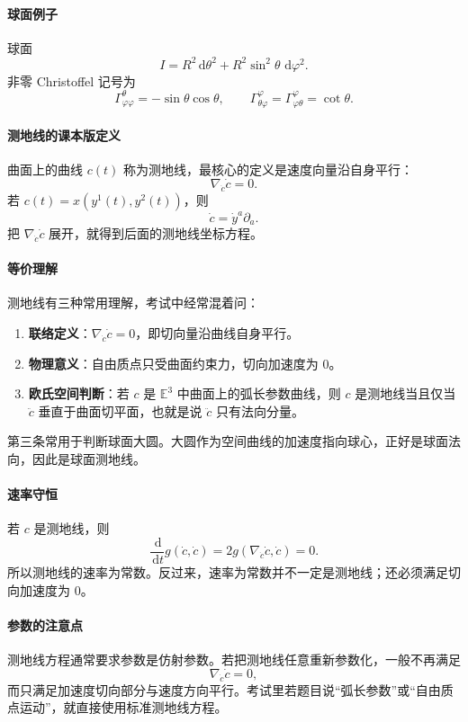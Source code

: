 \documentclass[UTF8,12pt,a4paper]{ctexart}
\newcommand{\E}{\mathbb E}
\newcommand{\dd}{\,\mathrm d}
\begin{document}
\paragraph{球面例子}
球面
\[
I=R^2\dd\theta^2+R^2\sin^2\theta\,\dd\varphi^2.
\]
非零 Christoffel 记号为
\[
\Gamma^\theta_{\varphi\varphi}=-\sin\theta\cos\theta,
\qquad
\Gamma^\varphi_{\theta\varphi}
=\Gamma^\varphi_{\varphi\theta}
=\cot\theta.
\]

\paragraph{测地线的课本版定义}
曲面上的曲线 $c(t)$ 称为测地线，最核心的定义是速度向量沿自身平行：
\[
\nabla_{\dot c}\dot c=0.
\]
若 $c(t)=x(y^1(t),y^2(t))$，则
\[
\dot c=\dot y^a\partial_a.
\]
把 $\nabla_{\dot c}\dot c$ 展开，就得到后面的测地线坐标方程。

\paragraph{等价理解}
测地线有三种常用理解，考试中经常混着问：
\begin{enumerate}
\item \textbf{联络定义}：$\nabla_{\dot c}\dot c=0$，即切向量沿曲线自身平行。
\item \textbf{物理意义}：自由质点只受曲面约束力，切向加速度为 $0$。
\item \textbf{欧氏空间判断}：若 $c$ 是 $\E^3$ 中曲面上的弧长参数曲线，则 $c$ 是测地线当且仅当 $\ddot c$ 垂直于曲面切平面，也就是说 $\ddot c$ 只有法向分量。
\end{enumerate}
第三条常用于判断球面大圆。大圆作为空间曲线的加速度指向球心，正好是球面法向，因此是球面测地线。

\paragraph{速率守恒}
若 $c$ 是测地线，则
\[
\frac{\dd}{\dd t}g(\dot c,\dot c)
=2g(\nabla_{\dot c}\dot c,\dot c)=0.
\]
所以测地线的速率为常数。反过来，速率为常数并不一定是测地线；还必须满足切向加速度为 $0$。

\paragraph{参数的注意点}
测地线方程通常要求参数是仿射参数。若把测地线任意重新参数化，一般不再满足
\[
\nabla_{\dot c}\dot c=0,
\]
而只满足加速度切向部分与速度方向平行。考试里若题目说“弧长参数”或“自由质点运动”，就直接使用标准测地线方程。
\end{document}
